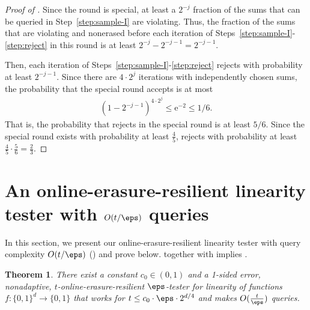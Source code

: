 \documentclass[11pt]{article}
\numberwithin{equation}{section}
\newtheorem{theorem}{Theorem}[section]
\theoremstyle{definition}
\theoremstyle{plain}
\newcommand{\eee}{\mathrm e}
\begin{document}
\begin{proof}[Proof of ]
Since the round is special, at least a $2^{-j}$ fraction of the sums that can be queried in Step~\ref{step:sample-I} are violating.
Thus,
the fraction of the sums that are violating and nonerased before each iteration of Steps~\ref{step:sample-I}-\ref{step:reject} in this round is at least $2^{-j}-2^{-j-1}=2^{-j-1}.$

Then, each iteration of Steps~\ref{step:sample-I}-\ref{step:reject} rejects with probability at least $2^{-j-1}.$ Since there are $4\cdot 2^j$ iterations with independently chosen sums, the probability that the special round accepts is at most 
\begin{align*}
(1-2^{-j-1})^{4 \cdot 2^j} \leq \eee^{-2}\leq  1/ 6.
\end{align*}
That is, the probability that  rejects in the special round is at least $5/6$. Since the special round exists with probability at least $\frac{4}{5}$,  rejects with probability at least $\frac{4}{5}\cdot \frac{5}{6} = \frac{2}{3}$. 
\end{proof}



%
%
\section{An online-erasure-resilient linearity tester with $O(t/\eps)$ queries} \label{sec:linearity_appendix}


%
%
In this section, we present our online-erasure-resilient linearity tester with query complexity $O(t/\eps)$ () and prove   below.  together with  implies . 

\begin{theorem}\label{thm:linearity}
There exist a constant $c_0 \in (0,1)$ and a 1-sided error, nonadaptive, $t$-online-erasure-resilient $\eps$-tester for linearity of functions $f\colon \{0,1\}^d \to \{0,1\}$ that  works for $t \leq c_0\cdot\eps \cdot  2^{d/4}$ and makes $O(\frac{t}{\eps})$ queries.
\end{theorem}
\end{document}
